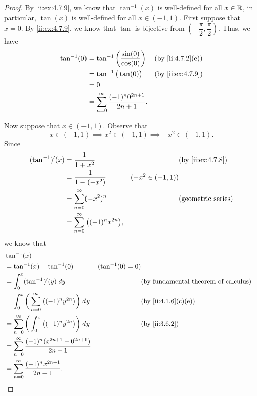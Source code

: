 \begin{proof}
  By \cref{ii:ex:4.7.9}, we know that \(\tan^{-1}(x)\) is well-defined for all \(x \in \mathbb{R}\), in particular, \(\tan(x)\) is well-defined for all \(x \in (-1, 1)\).
  First suppose that \(x = 0\).
  By \cref{ii:ex:4.7.9}, we know that \(\tan\) is bijective from \((-\dfrac{\pi}{2}, \dfrac{\pi}{2})\).
  Thus, we have
  \begin{align*}
    \tan^{-1}(0) & = \tan^{-1}\bigg(\dfrac{\sin(0)}{\cos(0)}\bigg)          &  & \by{ii:4.7.2}[e] \\
                 & = \tan^{-1}\big(\tan(0)\big)                             &  & \by{ii:ex:4.7.9} \\
                 & = 0                                                                            \\
                 & = \sum_{n = 0}^\infty \dfrac{(-1)^n 0^{2n + 1}}{2n + 1}.
  \end{align*}

  Now suppose that \(x \in (-1, 1)\).
  Observe that
  \[
    x \in (-1, 1) \implies x^2 \in (-1, 1) \implies -x^2 \in (-1, 1).
  \]
  Since
  \begin{align*}
    (\tan^{-1})'(x) & = \dfrac{1}{1 + x^2}                           &                    & \by{ii:ex:4.7.8}          \\
                    & = \dfrac{1}{1 - (-x^2)}                        & (-x^2 \in (-1, 1))                             \\
                    & = \sum_{n = 0}^\infty (-x^2)^n                 &                    & \text{(geometric series)} \\
                    & = \sum_{n = 0}^\infty \big((-1)^n x^{2n}\big),
  \end{align*}
  we know that
  \begin{align*}
     & \tan^{-1}(x)                                                                                                                                  \\
     & = \tan^{-1}(x) - \tan^{-1}(0)                                              & (\tan^{-1}(0) = 0)                                               \\
     & = \int_0^x (\tan^{-1})'(y) \; dy                                           &                    & \text{(by fundamental theorem of calculus)} \\
     & = \int_{0}^x \bigg(\sum_{n = 0}^\infty \big((-1)^n y^{2n}\big)\bigg) \; dy &                    & \by{ii:4.1.6}[c,e]                          \\
     & = \sum_{n = 0}^\infty \bigg(\int_{0}^x \big((-1)^n y^{2n}\big)\bigg) \; dy &                    & \by{ii:3.6.2}                               \\
     & = \sum_{n = 0}^\infty \dfrac{(-1)^n (x^{2n + 1} - 0^{2n + 1})}{2n + 1}                                                                        \\
     & = \sum_{n = 0}^\infty \dfrac{(-1)^n x^{2n + 1}}{2n + 1}.
  \end{align*}


\end{proof}

